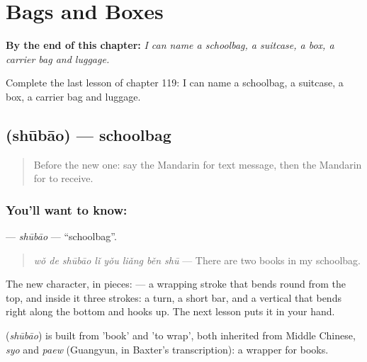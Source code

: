 
\chapter{Bags and Boxes}
\label{ch:zh-bags-and-boxes}

\begin{chapteropening}
\textbf{By the end of this chapter:} \emph{I can name a schoolbag, a suitcase, a box, a carrier bag and luggage.}

Complete the last lesson of chapter 119: I can name a schoolbag, a suitcase, a box, a carrier bag and luggage.
\end{chapteropening}

\section[\texorpdfstring{\zh{书包} (shūbāo)}{书包 (shūbāo)}]{ (shūbāo) — schoolbag}

\label{lesson:ZH-C119-shubao}



\begin{quote}
Before the new one: say the Mandarin for text message, then the Mandarin for to receive.
\end{quote}

\subsection*{You'll want to know: }
\textbf{} — \emph{shūbāo} — \textquotedblleft{}schoolbag\textquotedblright{}.

\begin{quote}
\textbf{} \emph{wǒ de shūbāo lǐ yǒu liǎng běn shū} — There are two books in my schoolbag.
\end{quote}

The new character, in pieces:  — a wrapping stroke that bends round from the top, and inside it three strokes: a turn, a short bar, and a vertical that bends right along the bottom and hooks up. The next lesson puts it in your hand.

\begin{cousinweb}
\textbf{} (\emph{shūbāo}) is built from  'book' and  'to wrap', both inherited from Middle Chinese, \emph{syo} and \emph{paew} (Guangyun, in Baxter's transcription): a wrapper for books.
\end{cousinweb}

